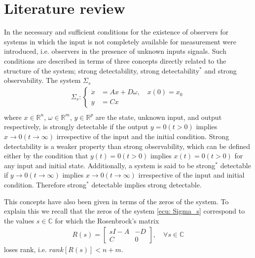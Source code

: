 \documentclass[11pt,letterpaper,twoside,openright]{report}
\begin{document}
\section{Literature review}
In \cite{Hautus1983}\cite{Trentelman2001} the necessary and sufficient conditions for the existence of observers for systems in which the input is not completely available for measurement were introduced, i.e. observers in the presence of unknown inputs signals. Such conditions are described in terms of three concepts directly related to the structure of the system; strong detectability, strong detectability$^*$ and strong observability. The system $\Sigma_s$
	\begin{equation}\label{ecu: Sigma_s}
\begin{split}
\Sigma_s: \left\{
\begin{array}{rl}
\dot{x} &= Ax + D\omega, \quad x(0)=x_0 \\
y&=Cx
\end{array}
\right. \\
\end{split}
	\end{equation}
where $x \in \mathbb{R}^n$, $\omega \in \mathbb{R}^m$, $y \in \mathbb{R}^p$ are the state, unknown input, and output respectively, is strongly detectable if the output $y = 0 (t > 0)$ implies $x \rightarrow 0 (t \rightarrow \infty)$ irrespective of the input and the initial condition. Strong detectability is a weaker property than strong observability, which can be defined either by the condition that $y(t) = 0 (t > 0)$ implies $x(t) = 0 (t > 0)$ for any input and initial state. Additionally, a system is said to be strong$^*$ detectable if $y \rightarrow 0 (t \rightarrow \infty)$ implies $x \rightarrow 0 (t \rightarrow \infty)$ irrespective of the input and initial condition. Therefore strong$^*$ detectable implies strong detectable. 

This concepts have also been given in terms of the zeros of the system. To explain this we recall that the zeros of the system \eqref{ecu: Sigma_s} correspond to the values $s\in \mathbb{C}$ for which the Rosenbrock's matrix 
	\begin{equation}\label{ecu: Rosenbrok}
\begin{split}
R(s)=
\begin{bmatrix}
sI-A & -D\\
C & 0	
\end{bmatrix}, \quad \forall s\in \mathbb{C}
\end{split}
	\end{equation} 
loses rank, i.e. $rank[R(s)] < n+m$.
\end{document}
